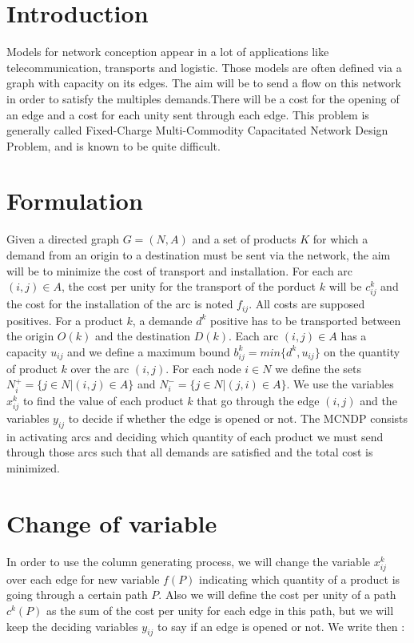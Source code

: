 \newpage\cleardoublepage{}
\section{Introduction}
Models for network conception appear in a lot of applications like telecommunication, transports and logistic. Those models are often defined via a graph with capacity on its edges. The aim will be to send a flow on this network in order to satisfy the multiples demands.There will be a cost for the opening of an edge and a cost for each unity sent through each edge. This problem is generally called Fixed-Charge Multi-Commodity Capacitated Network Design Problem, and is known to be quite difficult.

\section{Formulation}
Given a directed graph $G=(N,A)$ and a set of products $K$ for which a demand from an origin to a destination must be sent via the network, the aim will be to minimize the cost of transport and installation. For each arc $(i,j) \in A$, the cost per unity for the transport of the porduct $k$ will be $c^k_{ij}$ and the cost for the installation of the arc is noted $f_{ij}$. All costs are supposed positives. For a product $k$, a demande $d^k$ positive has to be transported between the origin $O(k)$ and the destination $D(k)$. Each arc $(i,j) \in A$ has a capacity $u_{ij}$ and we define a maximum bound $b^k_{ij}=min\{d^k,u_{ij}\}$ on the quantity of product $k$ over the arc $(i,j)$. For each node $i \in N$ we define the sets $N^+_i=\{j\in N|(i,j)\in A\}$ and $N^-_i=\{j\in N|(j,i)\in A\}$. We use the variables $x^k_{ij}$ to find the value of each product $k$ that go through the edge $(i,j)$ and the variables $y_{ij}$ to decide if whether the edge is opened or not. The MCNDP consists in activating arcs and deciding which quantity of each product we must send through those arcs such that all demands are satisfied and the total cost is minimized.

\section{Change of variable}
In order to use the column generating process, we will change the variable $x^k_{ij}$ over each edge for new variable $f(P)$ indicating which quantity of a product is going through a certain path $P$. Also we will define the cost per unity of a path $c^k (P)$ as the sum of the cost per unity for each edge in this path, but we will keep the deciding variables $y_{ij}$ to say if an edge is opened or not. We write then :

